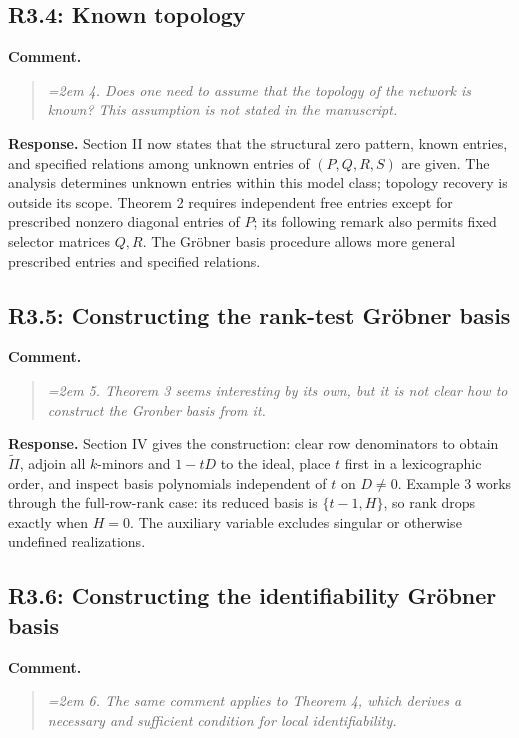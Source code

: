 \documentclass[11pt]{article}
\begin{document}
\subsection*{R3.4: Known topology}
\textbf{Comment.}
\begin{quote}\itshape\emergencystretch=2em
4. Does one need to assume that the topology of the network is known? This assumption is not stated in the manuscript.
\end{quote}

\textbf{Response.} Section II now states that the structural zero pattern,
known entries, and specified relations among unknown entries of
$(P,Q,R,S)$ are given. The analysis determines unknown entries
within this model class; topology recovery is outside its scope. Theorem 2
requires independent free entries except for prescribed nonzero diagonal
entries of $P$; its following remark also permits fixed selector matrices
$Q,R$. The Gr\"obner basis procedure allows more general prescribed entries
and specified relations.

\subsection*{R3.5: Constructing the rank-test Gr\"obner basis}
\textbf{Comment.}
\begin{quote}\itshape\emergencystretch=2em
5. Theorem 3 seems interesting by its own, but it is not clear how to construct the Gronber basis from it.
\end{quote}

\textbf{Response.} Section IV gives the construction: clear row
denominators to obtain $\widetilde\Pi$, adjoin all $k$-minors and $1-tD$
to the ideal, place $t$ first in a lexicographic order, and inspect basis
polynomials independent of $t$ on $D\ne0$. Example 3 works through the
full-row-rank case: its reduced basis is $\{t-1,H\}$, so rank drops exactly
when $H=0$. The auxiliary variable excludes singular or otherwise
undefined realizations.

\subsection*{R3.6: Constructing the identifiability Gr\"obner basis}
\textbf{Comment.}
\begin{quote}\itshape\emergencystretch=2em
6. The same comment applies to Theorem 4, which derives a necessary and sufficient condition for local identifiability.
\end{quote}
\end{document}
